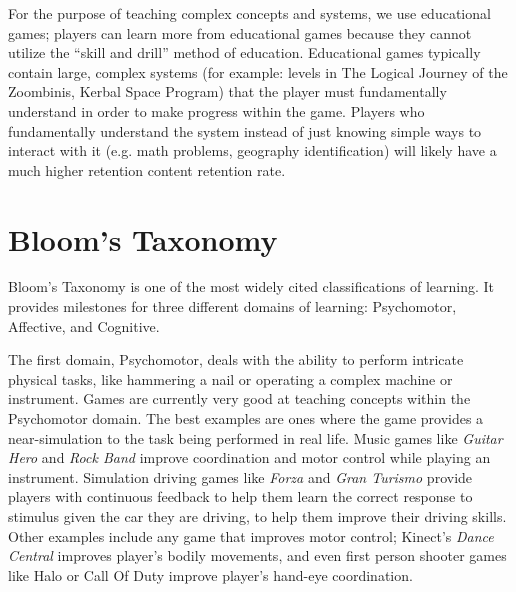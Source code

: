 \documentclass[12pt]{report}
\begin{document}
		For the purpose of teaching complex concepts and systems, we use educational games; players can learn more from educational games because they cannot utilize the ``skill and drill'' method of education. Educational games typically contain large, complex systems (for example: levels in The Logical Journey of the Zoombinis, Kerbal Space Program) that the player must fundamentally understand in order to make progress within the game. Players who fundamentally understand the system instead of just knowing simple ways to interact with it (e.g. math problems, geography identification) will likely have a much higher retention content retention rate.


	\section{Bloom's Taxonomy}

		Bloom's Taxonomy \cite{bloom} is one of the most widely cited classifications of learning. It provides milestones for three different domains of learning: Psychomotor, Affective, and Cognitive.

		The first domain, Psychomotor, deals with the ability to perform intricate physical tasks, like hammering a nail or operating a complex machine or instrument. Games are currently very good at teaching concepts within the Psychomotor domain. The best examples are ones where the game provides a near-simulation to the task being performed in real life. Music games like \textit {Guitar Hero} and \textit{Rock Band} improve coordination and motor control while playing an instrument. Simulation driving games like \textit{Forza} and \textit{Gran Turismo} provide players with continuous feedback to help them learn the correct response to stimulus given the car they are driving, to help them improve their driving skills. Other examples include any game that improves motor control; Kinect's \textit{Dance Central} improves player's bodily movements, and even first person shooter games like Halo or Call Of Duty improve player's hand-eye coordination.
\end{document}
